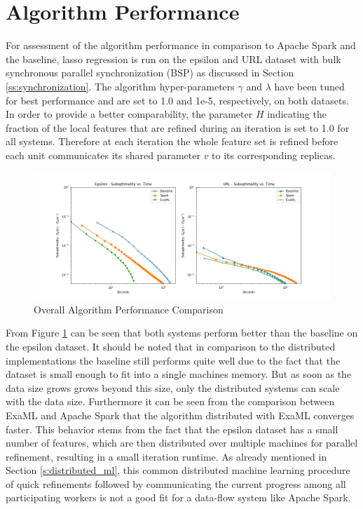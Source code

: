\section{Algorithm Performance}
For assessment of the algorithm performance in comparison to Apache Spark and the baseline, lasso regression is run on the epsilon and URL dataset with bulk synchronous parallel synchronization (BSP) as discussed in Section \ref{ss:synchronization}.
The algorithm hyper-parameters $\gamma$ and $\lambda$ have been tuned for best performance and are set to 1.0 and 1e-5, respectively, on both datasets.
In order to provide a better comparability, the parameter $H$ indicating the fraction of the local features that are refined during an iteration is set to 1.0 for all systems.
Therefore at each iteration the whole feature set is refined before each unit communicates its shared parameter $v$ to its corresponding replicas. 
\begin{figure}[ht]
\centering
\includegraphics[width=1.0\textwidth]{img/overall_perf_cmp.png}
\caption{Overall Algorithm Performance Comparison}
\label{fig:algo_perf_cmp}
\end{figure}
From Figure \ref{fig:algo_perf_cmp} can be seen that both systems perform better than the baseline on the epsilon dataset.
It should be noted that in comparison to the distributed implementations the baseline still performs quite well due to the fact that the dataset is small enough to fit into a single machines memory.
But as soon as the data size grows grows beyond this size, only the distributed systems can scale with the data size.
Furthermore it can be seen from the comparison between ExaML and Apache Spark that the algorithm distributed with ExaML converges faster.
This behavior stems from the fact that the epsilon dataset has a small number of features, which are then distributed over multiple machines for parallel refinement, resulting in a small iteration runtime.
As already mentioned in Section \ref{s:distributed_ml}, this common distributed machine learning procedure of quick refinements followed by communicating the current progress among all participating workers is not a good fit for a data-flow system like Apache Spark.
